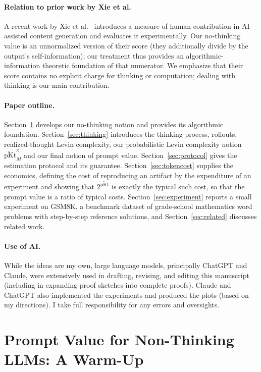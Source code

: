 \documentclass[letterpaper]{article} %
\theoremstyle{definition}
\theoremstyle{remark}
\newcommand{\pKt}{\mathrm{pKt}}
\newcommand{\pKtt}{\widetilde{\pKt}}
\begin{document}
\paragraph{Relation to prior work by Xie et al.}
A recent work by Xie et al.\ \cite{Xie26} introduces a measure of human
contribution in AI-assisted content generation and evaluates it
experimentally. Our no-thinking value is an unnormalized
version of their score (they additionally divide by the output's
self-information); our treatment thus provides an algorithmic-information theoretic
foundation of that numerator. We emphasize that their score contains no explicit charge for thinking or computation;
dealing with thinking is our main contribution.

\paragraph{Paper outline.}
Section~\ref{sec:exact} develops our no-thinking notion and provides its algorithmic foundation.
Section~\ref{sec:thinking} introduces the thinking process, rollouts,
realized-thought Levin complexity,  our probabilistic Levin complexity notion
$\pKtt^{\kappa}_M$ and our final notion of prompt value.
Section~\ref{sec:protocol} gives the estimation protocol and its guarantee.
Section~\ref{sec:tokencost} supplies the economics, defining the cost of
reproducing an artifact by the expenditure of an experiment and showing that
$2^{\pKtt}$ is exactly the typical such cost, so that the prompt value is a ratio
of typical costs.
Section~\ref{sec:experiment} reports a small experiment on GSM8K, a benchmark dataset of grade-school mathematics word problems with step-by-step reference solutions, and Section~\ref{sec:related} discusses related work.

\paragraph{Use of AI.}
While the ideas are my own, large language models, principally ChatGPT and Claude, were extensively used
in drafting, revising, and editing this manuscript (including in expanding proof
sketches into complete proofs). Claude and ChatGPT also implemented the experiments and produced the plots (based on my directions). I take full responsibility for any errors and oversights.

\section{Prompt Value for Non-Thinking LLMs: A Warm-Up}\label{sec:exact}
\end{document}
